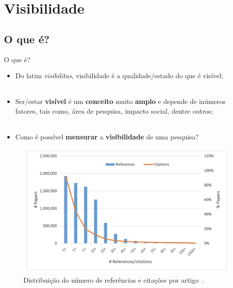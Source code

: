 \section{Visibilidade}
\label{s.visibility}

\subsection{O que é?}
\label{ss.what_visibility}

\begin{frame}{O que é?}
	\justify 
	\begin{itemize}
		\item<1> Do latim \textit{visibilitas}, visibilidade é a qualidade/estado do que é visível;
		\\~\\
		\item<2> Ser/estar \textbf{visível} é um \textbf{conceito} muito \textbf{amplo} e depende de inúmeros fatores, tais como, área de pesquisa, impacto social, dentre outros;
		\\~\\
		\item<3> Como é possível \textbf{mensurar} a \textbf{visibilidade} de uma pesquisa?
	\end{itemize}
\end{frame}

\begin{frame}{}
	\centering
	\begin{figure}
		\includegraphics[scale=0.375]{figs/citations_per_paper.png}
		\caption{Distribuição do número de referências e citações por artigo~\cite{Fiala:17}.}
		\label{f.citations_per_paper}
	\end{figure}	
\end{frame}

